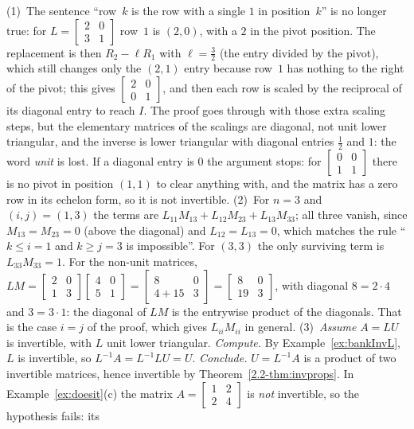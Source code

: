 \documentclass[11pt]{article}
\begin{document}
\begin{description}[leftmargin=0pt,itemsep=5pt]
  \item[Pause and think \ref{think:habits}.] (1)~The sentence ``row~$k$ is the row with a single $1$ in position~$k$'' is no longer true: for $L=\begin{bmatrix}2&0\\3&1\end{bmatrix}$ row~$1$ is $(2,0)$, with a $2$ in the pivot position. The replacement is then $R_2-\ell R_1$ with $\ell=\tfrac32$ (the entry divided by the pivot), which still changes only the $(2,1)$ entry because row~$1$ has nothing to the right of the pivot; this gives $\begin{bmatrix}2&0\\0&1\end{bmatrix}$, and then each row is scaled by the reciprocal of its diagonal entry to reach $I$. The proof goes through with those extra scaling steps, but the elementary matrices of the scalings are diagonal, not unit lower triangular, and the inverse is lower triangular with diagonal entries $\tfrac12$ and $1$: the word \emph{unit} is lost. If a diagonal entry is $0$ the argument stops: for $\begin{bmatrix}0&0\\1&1\end{bmatrix}$ there is no pivot in position $(1,1)$ to clear anything with, and the matrix has a zero row in its echelon form, so it is not invertible. (2)~For $n=3$ and $(i,j)=(1,3)$ the terms are $L_{11}M_{13}+L_{12}M_{23}+L_{13}M_{33}$; all three vanish, since $M_{13}=M_{23}=0$ (above the diagonal) and $L_{12}=L_{13}=0$, which matches the rule ``$k\le i=1$ and $k\ge j=3$ is impossible''. For $(3,3)$ the only surviving term is $L_{33}M_{33}=1$. For the non-unit matrices, $LM=\begin{bmatrix}2&0\\1&3\end{bmatrix}\begin{bmatrix}4&0\\5&1\end{bmatrix}=\begin{bmatrix}8&0\\4+15&3\end{bmatrix}=\begin{bmatrix}8&0\\19&3\end{bmatrix}$, with diagonal $8=2\cdot4$ and $3=3\cdot1$: the diagonal of $LM$ is the entrywise product of the diagonals. That is the case $i=j$ of the proof, which gives $L_{ii}M_{ii}$ in general. (3)~\emph{Assume} $A=LU$ is invertible, with $L$ unit lower triangular. \emph{Compute.} By Example~\ref{ex:bankInvL}, $L$ is invertible, so $L^{-1}A=L^{-1}LU=U$. \emph{Conclude.} $U=L^{-1}A$ is a product of two invertible matrices, hence invertible by Theorem~\ref{2.2-thm:invprops}. In Example~\ref{ex:doesit}(c) the matrix $A=\begin{bmatrix}1&2\\2&4\end{bmatrix}$ is \emph{not} invertible, so the hypothesis fails: its 
\end{description}
\end{document}
